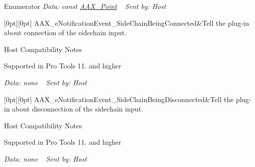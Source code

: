 \begin{DoxyEnumFields}{Enumerator}
{\itshape Data\+: {\ttfamily const} \mbox{\hyperlink{a01609}{A\+A\+X\+\_\+\+Point}}} ~\newline
 {\itshape Sent by\+: Host} \\
\hline

[0pt][0pt]{}\mbox{\label{a00491_afab5ea2cfd731fc8f163b6caa685406ea54cabeb905a0592e08ab9e334c09e941}} 
A\+A\+X\+\_\+e\+Notification\+Event\+\_\+\+Side\+Chain\+Being\+Connected&Tell the plug-\/in about connection of the sidechain input. \begin{DoxyRefDesc}{Host Compatibility Notes}
\item[\mbox{\hyperlink{a00786__compatibility_notes000043}{Host Compatibility Notes}}]Supported in Pro Tools 11. and higher\end{DoxyRefDesc}


{\itshape Data\+: none} ~\newline
 {\itshape Sent by\+: Host} \\
\hline

[0pt][0pt]{}\mbox{\label{a00491_afab5ea2cfd731fc8f163b6caa685406eaadec5c7f6ff4185fef3822e426f4bb56}} 
A\+A\+X\+\_\+e\+Notification\+Event\+\_\+\+Side\+Chain\+Being\+Disconnected&Tell the plug-\/in about disconnection of the sidechain input. \begin{DoxyRefDesc}{Host Compatibility Notes}
\item[\mbox{\hyperlink{a00786__compatibility_notes000044}{Host Compatibility Notes}}]Supported in Pro Tools 11. and higher\end{DoxyRefDesc}


{\itshape Data\+: none} ~\newline
 {\itshape Sent by\+: Host} \\
\hline


\end{DoxyEnumFields}
